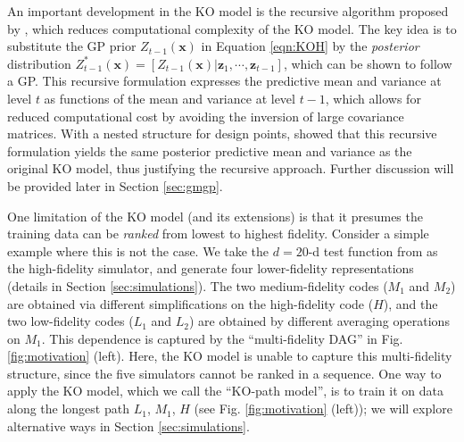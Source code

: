 \documentclass[12pt]{article}
\newcommand{\bs}[1]{\boldsymbol{#1}}
\begin{document}

An important development in the KO model is the recursive algorithm proposed by \cite{LeGratiet_2014}, which reduces computational complexity of the KO model. The key idea is to substitute the GP prior $Z_{t-1}(\bs{x})$ in Equation \eqref{eqn:KOH} by the \textit{posterior} distribution ${Z}^*_{t-1}(\bs{x}) = [Z_{t-1}(\bs{x})|\bs{z}_1,\cdots,\bs{z}_{t-1}]$, which can be shown to follow a GP.  This recursive formulation expresses the predictive mean and variance at level $t$ as functions of the mean and variance at level $t-1$, which allows for reduced computational cost by avoiding the inversion of large covariance matrices. With a nested structure for design points, \cite{LeGratiet_2014} showed that this recursive formulation yields the same posterior predictive mean and variance as the original KO model, thus justifying the recursive approach. Further discussion will be provided later in Section \ref{sec:gmgp}.

One limitation of the KO model (and its extensions) is that it presumes the training data can be \textit{ranked} from lowest to highest fidelity. Consider a simple example where this is not the case. We take the $d=20$-d test function from \cite{WELCH1992} as the high-fidelity simulator, and generate four lower-fidelity representations (details in Section \ref{sec:simulations}). The two medium-fidelity codes ($M_1$ and $M_2$) are obtained via different simplifications on the high-fidelity code ($H$), and the two low-fidelity codes ($L_1$ and $L_2$) are obtained by different averaging operations on $M_1$. This dependence is captured by the ``multi-fidelity DAG'' in Fig. \ref{fig:motivation} (left). Here, the KO model is unable to capture this multi-fidelity structure, since the five simulators cannot be ranked in a sequence. One way to apply the KO model, which we call the ``KO-path model'', is to train it on data along the longest path $L_1$, $M_1$, $H$ (see Fig. \ref{fig:motivation} (left)); we will explore alternative ways in Section \ref{sec:simulations}.
\end{document}

